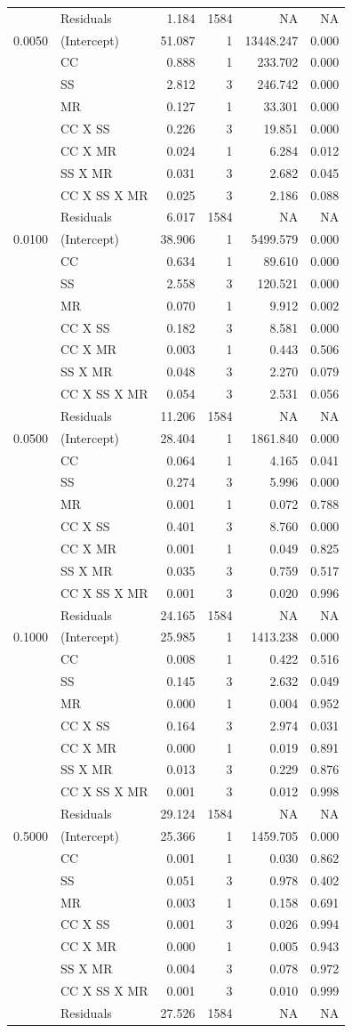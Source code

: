 \documentclass[]{article}
\theoremstyle{definition}
\theoremstyle{definition}
\theoremstyle{remark}
\begin{document}
\begin{longtable}[]{@{}llrrrr@{}}
& Residuals & 1.184 & 1584 & NA & NA\tabularnewline
0.0050 & (Intercept) & 51.087 & 1 & 13448.247 & 0.000\tabularnewline
& CC & 0.888 & 1 & 233.702 & 0.000\tabularnewline
& SS & 2.812 & 3 & 246.742 & 0.000\tabularnewline
& MR & 0.127 & 1 & 33.301 & 0.000\tabularnewline
& CC X SS & 0.226 & 3 & 19.851 & 0.000\tabularnewline
& CC X MR & 0.024 & 1 & 6.284 & 0.012\tabularnewline
& SS X MR & 0.031 & 3 & 2.682 & 0.045\tabularnewline
& CC X SS X MR & 0.025 & 3 & 2.186 & 0.088\tabularnewline
& Residuals & 6.017 & 1584 & NA & NA\tabularnewline
0.0100 & (Intercept) & 38.906 & 1 & 5499.579 & 0.000\tabularnewline
& CC & 0.634 & 1 & 89.610 & 0.000\tabularnewline
& SS & 2.558 & 3 & 120.521 & 0.000\tabularnewline
& MR & 0.070 & 1 & 9.912 & 0.002\tabularnewline
& CC X SS & 0.182 & 3 & 8.581 & 0.000\tabularnewline
& CC X MR & 0.003 & 1 & 0.443 & 0.506\tabularnewline
& SS X MR & 0.048 & 3 & 2.270 & 0.079\tabularnewline
& CC X SS X MR & 0.054 & 3 & 2.531 & 0.056\tabularnewline
& Residuals & 11.206 & 1584 & NA & NA\tabularnewline
0.0500 & (Intercept) & 28.404 & 1 & 1861.840 & 0.000\tabularnewline
& CC & 0.064 & 1 & 4.165 & 0.041\tabularnewline
& SS & 0.274 & 3 & 5.996 & 0.000\tabularnewline
& MR & 0.001 & 1 & 0.072 & 0.788\tabularnewline
& CC X SS & 0.401 & 3 & 8.760 & 0.000\tabularnewline
& CC X MR & 0.001 & 1 & 0.049 & 0.825\tabularnewline
& SS X MR & 0.035 & 3 & 0.759 & 0.517\tabularnewline
& CC X SS X MR & 0.001 & 3 & 0.020 & 0.996\tabularnewline
& Residuals & 24.165 & 1584 & NA & NA\tabularnewline
0.1000 & (Intercept) & 25.985 & 1 & 1413.238 & 0.000\tabularnewline
& CC & 0.008 & 1 & 0.422 & 0.516\tabularnewline
& SS & 0.145 & 3 & 2.632 & 0.049\tabularnewline
& MR & 0.000 & 1 & 0.004 & 0.952\tabularnewline
& CC X SS & 0.164 & 3 & 2.974 & 0.031\tabularnewline
& CC X MR & 0.000 & 1 & 0.019 & 0.891\tabularnewline
& SS X MR & 0.013 & 3 & 0.229 & 0.876\tabularnewline
& CC X SS X MR & 0.001 & 3 & 0.012 & 0.998\tabularnewline
& Residuals & 29.124 & 1584 & NA & NA\tabularnewline
0.5000 & (Intercept) & 25.366 & 1 & 1459.705 & 0.000\tabularnewline
& CC & 0.001 & 1 & 0.030 & 0.862\tabularnewline
& SS & 0.051 & 3 & 0.978 & 0.402\tabularnewline
& MR & 0.003 & 1 & 0.158 & 0.691\tabularnewline
& CC X SS & 0.001 & 3 & 0.026 & 0.994\tabularnewline
& CC X MR & 0.000 & 1 & 0.005 & 0.943\tabularnewline
& SS X MR & 0.004 & 3 & 0.078 & 0.972\tabularnewline
& CC X SS X MR & 0.001 & 3 & 0.010 & 0.999\tabularnewline
& Residuals & 27.526 & 1584 & NA & NA\tabularnewline
\bottomrule
\end{longtable}
\end{document}
